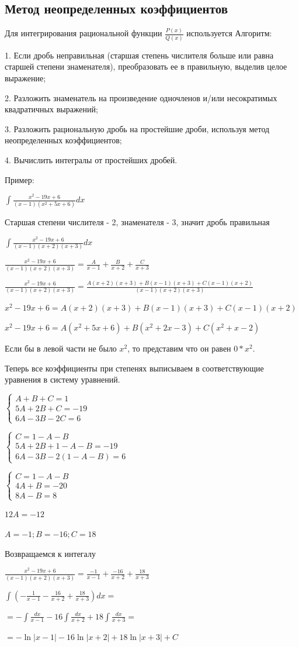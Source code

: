 \documentclass[12pt,a4paper]{article}
\begin{document}
\subsection{Метод неопределенных коэффициентов}
Для интегрирования рациональной функции $\frac{P(x)}{Q(x)}$ используется Алгоритм:

1. Если дробь неправильная (старшая степень числителя больше или равна старшей степени знаменателя), преобразовать ее в правильную, выделив целое выражение; 

2. Разложить знаменатель на произведение одночленов и/или несократимых квадратичных выражений; 

3. Разложить рациональную дробь на простейшие дроби, используя метод неопределенных коэффициентов; 

4. Вычислить интегралы от простейших дробей. 

Пример: 

$ \int{\frac{x^2-19x+6}{(x-1)(x^2+5x+6)}dx} $ 

Старшая степени числителя - 2, знаменателя - 3, значит дробь правильная 

$ \int{\frac{x^2-19x+6}{(x-1)(x+2)(x+3)}dx} $ 

$ \frac{x^2-19x+6}{(x-1)(x+2)(x+3)}=\frac{A}{x-1}+\frac{B}{x+2}+\frac{C}{x+3} $ 

$ \frac{x^2-19x+6}{(x-1)(x+2)(x+3)}=\frac{A(x+2)(x+3)+B(x-1)(x+3)+C(x-1)(x+2)}{(x-1)(x+2)(x+3)} $ 

$ x^2-19x+6=A(x+2)(x+3)+B(x-1)(x+3)+C(x-1)(x+2) $ 

$ x^2-19x+6=A(x^2+5x+6)+B(x^2+2x-3)+C(x^2+x-2) $ 

Если бы в левой части не было $x^2$, то представим что он равен $0*x^2$. 

Теперь все коэффициенты при степенях выписываем в соответствующие уравнения в систему уравнений. 

$\begin{cases}
A+B+C=1 \\
5A+2B+C=-19 \\
6A-3B-2C=6
\end{cases}$

$\begin{cases}
C=1-A-B \\
5A+2B+1-A-B=-19 \\
6A-3B-2(1-A-B)=6
\end{cases}$

$\begin{cases}
C=1-A-B \\
4A+B=-20 \\
8A-B=8
\end{cases}$

$ 12A=-12 $ 

$ A=-1; B=-16; C=18 $ 

Возвращаемся к интегалу 

$ \frac{x^2-19x+6}{(x-1)(x+2)(x+3)}=\frac{-1}{x-1}+\frac{-16}{x+2}+\frac{18}{x+3} $ 

$ \int{(-\frac{1}{x-1}-\frac{16}{x+2}+\frac{18}{x+3})dx}= $ 

$ =-\int{\frac{dx}{x-1}}-16\int{\frac{dx}{x+2}}+18\int{\frac{dx}{x+3}}= $ 

$ =-\ln|x-1|-16\ln|x+2|+18\ln|x+3|+C $ 
\end{document}
